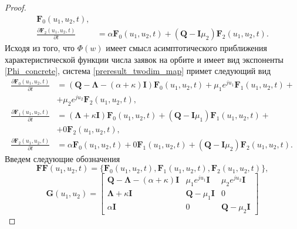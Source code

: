 \begin{proof}
\begin{equation}
\begin{split}
		 \boldsymbol{F}_{0}(u_{1},u_{2},t),
		\\
		\frac{{\partial \boldsymbol{F}_{2}(u_{1},u_{2},t)}}{{\partial t}} &= \alpha \boldsymbol{F}_{0}(u_{1},u_{2},t) + (\boldsymbol{Q} - \boldsymbol{I}\mu_{2})\boldsymbol{F}_{2}(u_{1},u_{2},t).
	\end{split}
	\end{equation}  
	Исходя из того, что  $\Phi(w)$ имеет смысл асимптотического приближения характеристической функции числа заявок на орбите и имеет вид экспоненты \eqref{Phi_concrete}, система \eqref{preresult_twodim_map} примет следующий вид
	\begin{equation} \label{result_twodim_map}
		\begin{split}
			\frac{{\partial \boldsymbol{F}_{0}(u_{1},u_{2},t)}}{{\partial t}} &= (\boldsymbol{Q}-\boldsymbol{\Lambda}-(\alpha + \kappa)\boldsymbol{I})\boldsymbol{F}_{0}(u_{1},u_{2},t) + \mu_{1} e^{ju_{1}}\boldsymbol{F}_{1}(u_{1},u_{2},t)  + \\  &+ \mu_{2}e^{ju_{2}}\boldsymbol{F}_{2}(u_{1},u_{2},t),
			\\
			\frac{{\partial \boldsymbol{F}_{1}(u_{1},u_{2},t)}}{{\partial t}} &= (\boldsymbol{\Lambda} + \kappa\boldsymbol{I}) \boldsymbol{F}_{0}(u_{1},u_{2},t) +  (\boldsymbol{Q} - \boldsymbol{I}\mu_{1})\boldsymbol{F}_{1}(u_{1},u_{2},t) + \\&+ 0\boldsymbol{F}_{2}(u_{1},u_{2},t),
			\\
			\frac{{\partial \boldsymbol{F}_{2}(u_{1},u_{2},t)}}{{\partial t}} &= \alpha \boldsymbol{F}_{0}(u_{1},u_{2},t) + 0\boldsymbol{F}_{1}(u_{1},u_{2},t) +  (\boldsymbol{Q} - \boldsymbol{I}\mu_{2})\boldsymbol{F}_{2}(u_{1},u_{2},t).
		\end{split}
	\end{equation}  
	Введем следующие обозначения
	\begin{equation*}
		\boldsymbol{FF}(u_{1},u_{2},t) = \{\boldsymbol{F}_{0}(u_{1},u_{2},t),\boldsymbol{F}_{1}(u_{1},u_{2},t),\boldsymbol{F}_{2}(u_{1},u_{2},t)\},
	\end{equation*}  
	\begin{equation*}
		\boldsymbol{G}(u_{1},u_{2})=\begin{bmatrix}
			\boldsymbol{Q}-\boldsymbol{\Lambda}-(\alpha + \kappa)\boldsymbol{I} & \mu_{1}e^{ju_{1}}\boldsymbol{I} &  \mu_{2}e^{ju_{2}}\boldsymbol{I}\\
			\boldsymbol{\Lambda}+\kappa\boldsymbol{I} & \boldsymbol{Q}-\mu_{1}\boldsymbol{I} & 0\\
			\alpha\boldsymbol{I} & 	0 &	\boldsymbol{Q}-\mu_{2}\boldsymbol{I}

\end{bmatrix}
\end{equation*}
\end{proof}
